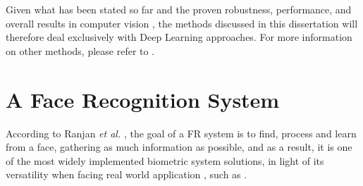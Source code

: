 \documentclass[class=report, crop=false, a4paper, 12pt]{standalone}
\begin{document}
\par Given what has been stated so far and the proven robustness, performance, and overall results in computer vision , the methods discussed in this dissertation will therefore deal exclusively with Deep Learning approaches. For more information on other methods, please refer to \autocite{learned-millerLabeledFacesWild2016}.






\section{A Face Recognition System}
\par According to Ranjan \textit{et al.} \autocite{ranjanDeepLearningUnderstanding2018}, the goal of a FR system is to find, process and learn from a face, gathering as much information as possible, and as a result, it is one of the most widely implemented biometric system solutions, in light of its versatility when facing real world application \autocite{duElementsEndtoendDeep2022}, such as .
\end{document}
